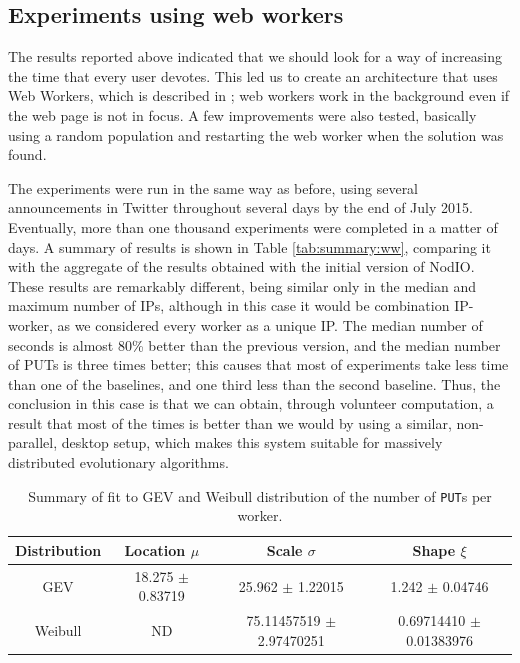 \documentclass[journal,onecolumn]{IEEEtran}
\begin{document}
\subsection{Experiments using web workers}
\label{sec:w2}

The results reported above indicated that we should look for a way of
increasing the time that every user devotes. This led us to create an
architecture that uses Web Workers, which is described in
\cite{2016arXiv160101607M}; web workers work in the background even if
the web page is not in focus. A few improvements were also tested,
basically using a random population and restarting the web worker when
the solution was found.

The experiments were run in the same way as before, using several
 announcements in Twitter throughout several days by the end of July
2015. Eventually, more than one thousand experiments were completed in
a matter of days. A summary of results is shown in Table
\ref{tab:summary:ww}, comparing it with the aggregate of the results
obtained with the initial version of {\sf NodIO}. These results are
remarkably different, being similar only in the median and maximum
number of IPs, although in this case it would be combination
IP-worker, as we considered every worker as a unique IP. The median
number of seconds is almost 80\% better than the previous version, and
the median number of PUTs is three times better; this causes that most
of experiments take less time than one of the baselines, and one third
less than the second baseline. Thus, the conclusion in this case is
that we can obtain, through volunteer computation, a result that most 
of the times is better than we would by using a similar, non-parallel,
desktop setup, which makes this system suitable for massively
distributed evolutionary algorithms.
%
\begin{table}
\caption{Summary of fit to GEV and Weibull distribution of
  the number of {\tt PUT}s per worker. \label{tab:puts:ww}}
\begin{center}
\begin{tabular}{cccc}
\hline
Distribution & Location $\mu$ & Scale $\sigma$ & Shape $\xi$ \\
\hline
GEV & 18.275 $\pm$ 0.83719  &  25.962  $\pm$ 1.22015 & 1.242   $\pm$
0.04746 \\
Weibull & ND & 75.11457519 $\pm$ 2.97470251  & 0.69714410 $\pm$ 0.01383976 \\
\hline
\end{tabular}
\end{center}
\end{table}
%
\end{document}
